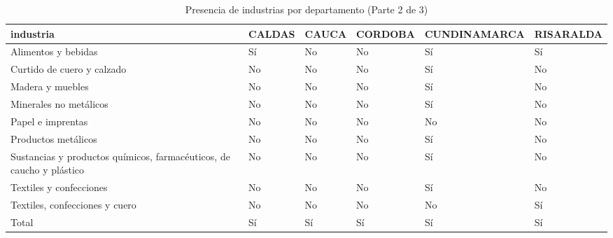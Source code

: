 \documentclass[12pt]{article}
\begin{document}
\setcounter{table}{2}
\begin{table}[htbp]
\centering
\large

\caption{Presencia de industrias por departamento (Parte 2 de 3)}
\begin{tabular}[t]{llllll}
\toprule
industria & CALDAS & CAUCA & CORDOBA & CUNDINAMARCA & RISARALDA\\
\midrule
Alimentos y bebidas & Sí & No & No & Sí & Sí\\
Curtido de cuero y calzado & No & No & No & Sí & No\\
Madera y muebles & No & No & No & Sí & No\\
Minerales no metálicos & No & No & No & Sí & No\\
Papel e imprentas & No & No & No & No & No\\
\addlinespace
Productos metálicos & No & No & No & Sí & No\\
Sustancias y productos químicos, farmacéuticos, de caucho y plástico & No & No & No & Sí & No\\
Textiles y confecciones & No & No & No & Sí & No\\
Textiles, confecciones y cuero & No & No & No & No & Sí\\
Total & Sí & Sí & Sí & Sí & Sí\\
\bottomrule
\end{tabular}
\end{table}
\end{document}
